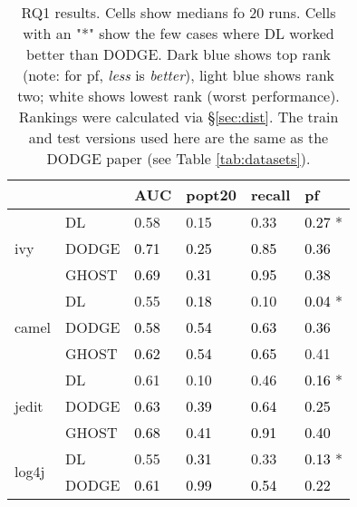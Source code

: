 \newcommand{\lightgray}[1]{\cellcolor{blue!7}\textcolor{black}{#1}}
\newcommand{\gray}[1]{\cellcolor{blue!20}\textcolor{black}{#1}}

\begin{table}[!t]
\caption{RQ1 results.
Cells show medians fo 20 runs.
Cells with an  "*" show the few
cases where DL
worked better than DODGE.
 \colorbox{blue!20}{Dark blue} shows  top rank (note: for pf, {\em less}
 is {\em better}), \colorbox{blue!7}{light blue} shows rank two;  white shows  lowest rank (worst performance). 
Rankings were calculated via
\S\ref{sec:dist}. The train and test versions used here are the same as the DODGE paper (see Table \ref{tab:datasets}).
}
\label{tab:results}
~~~~~~~~\begin{tabular}{ll|llll}
\toprule
                                         &       & AUC  & popt20 & recall & pf   \\ \midrule
\multicolumn{1}{l}{\multirow{3}{*}{ivy}} & DL &  0.58 & 0.15 & 0.33 & \gray{0.27} * \\
\multicolumn{1}{c}{}                     & DODGE & \gray{0.71} & \lightgray{0.25}   & \lightgray{0.85}   & \lightgray{0.36} \\
\multicolumn{1}{c}{}                     & GHOST & \lightgray{0.69}  & \gray{0.31}   & \gray{0.95}    & \lightgray{0.38} \\
\midrule \multirow{3}{*}{camel}          & DL & 0.55 & \lightgray{0.18} & 0.10 & \gray{0.04} *\\       
                                         & DODGE & \lightgray{0.58} & \gray{0.54}   & \lightgray{0.63}   & \lightgray{0.36} \\
                                         & GHOST & \gray{0.62} & \gray{0.54}   & \gray{0.65}   & 0.41 \\
\midrule \multirow{3}{*}{jedit}          & DL & 0.61 & 0.10 & 0.46 & \gray{0.16} *\\         
                                         & DODGE & \lightgray{0.63} & \lightgray{0.39}   & \lightgray{0.64}   & \gray{0.25} \\
                                         & GHOST & \gray{0.68} & \gray{0.41}   & \gray{0.91}   & \lightgray{0.40} \\
\midrule \multirow{3}{*}{log4j}          & DL & 0.55 & \lightgray{0.31} & 0.33 & \gray{0.13} *\\        
                                         & DODGE & \lightgray{0.61} & \gray{0.99}   & \lightgray{0.54}   & \lightgray{0.22} \\

\end{tabular}
\end{table}
